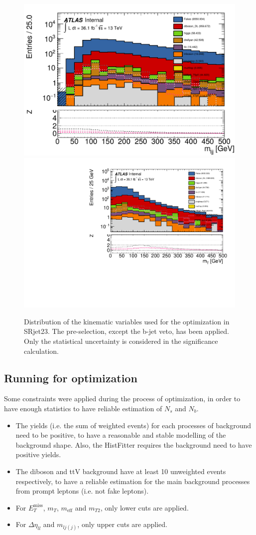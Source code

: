 \begin{figure}[htpb]
\includegraphics[width=0.45\linewidth]{data/plot/SR_redefinition/SRjet23_step0/lemljj_comb_fakes.pdf}\includegraphics[width=0.45\linewidth]{data/plot/SR_redefinition/SRjet23_step0/lemt_fakes.pdf}\\
\caption{Distribution of the kinematic variables used for the optimization in SRjet23. The pre-selection, except the b-jet veto, has been applied. Only the statistical uncertainty is considered in the significance calculation.}
\label{fig:SRjet23_pre-selection}
\end{figure}

\subsection{Running for optimization}
Some constraints were applied during the process of optimization, in order to have enough statistics to have reliable estimation of $N_s$ and $N_b$.
\begin{itemize}
\item The yields (i.e. the sum of weighted events) for each processes of background need to be positive, to have a reasonable and stable modelling of the background shape.
Also, the HistFitter requires the background need to have positive yields.
\item The diboson and ttV background have at least 10 unweighted events respectively, to have a reliable estimation for the main background processes from prompt leptons (i.e. not fake leptons).
\item For $E_T^{\text{miss}}$, $m_T$, $m_{\text{eff}}$ and $m_{T2}$, only lower cuts are applied.
\item For $\Delta \eta_{ll}$ and $m_{lj(j)}$, only upper cuts are applied.
\end{itemize}

